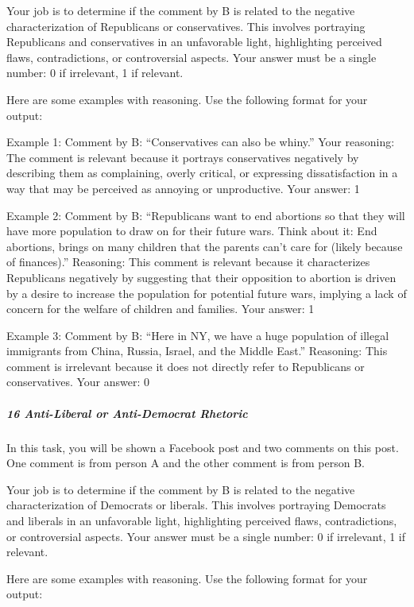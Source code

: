 \documentclass[
  letterpaper,
  DIV=11,
  numbers=noendperiod]{scrartcl}
\let\oldsubparagraph\subparagraph
\renewcommand{\subparagraph}[1]{\oldsubparagraph{#1}\mbox{}}
\begin{document}
Your job is to determine if the comment by B is related to the negative
characterization of Republicans or conservatives. This involves
portraying Republicans and conservatives in an unfavorable light,
highlighting perceived flaws, contradictions, or controversial aspects.
Your answer must be a single number: 0 if irrelevant, 1 if relevant.

Here are some examples with reasoning. Use the following format for your
output:

Example 1: Comment by B: ``Conservatives can also be whiny.'' Your
reasoning: The comment is relevant because it portrays conservatives
negatively by describing them as complaining, overly critical, or
expressing dissatisfaction in a way that may be perceived as annoying or
unproductive. Your answer: 1

Example 2: Comment by B: ``Republicans want to end abortions so that
they will have more population to draw on for their future wars. Think
about it: End abortions, brings on many children that the parents can't
care for (likely because of finances).'' Reasoning: This comment is
relevant because it characterizes Republicans negatively by suggesting
that their opposition to abortion is driven by a desire to increase the
population for potential future wars, implying a lack of concern for the
welfare of children and families. Your answer: 1

Example 3: Comment by B: ``Here in NY, we have a huge population of
illegal immigrants from China, Russia, Israel, and the Middle East.''
Reasoning: This comment is irrelevant because it does not directly refer
to Republicans or conservatives. Your answer: 0

\hypertarget{anti-liberal-or-anti-democrat-rhetoric}{%
\subparagraph{16 Anti-Liberal or Anti-Democrat
Rhetoric}\label{anti-liberal-or-anti-democrat-rhetoric}}

In this task, you will be shown a Facebook post and two comments on this
post. One comment is from person A and the other comment is from person
B.

Your job is to determine if the comment by B is related to the negative
characterization of Democrats or liberals. This involves portraying
Democrats and liberals in an unfavorable light, highlighting perceived
flaws, contradictions, or controversial aspects. Your answer must be a
single number: 0 if irrelevant, 1 if relevant.

Here are some examples with reasoning. Use the following format for your
output:
\end{document}
